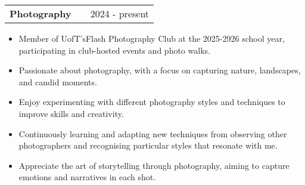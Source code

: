 \documentclass[a4paper,10pt]{article} %
\makeatletter
\newenvironment{joblong}[2]
    {
    \begin{tabularx}{\linewidth}{@{}l X r@{}}
    \textbf{#1} & \hfill &  #2 \\[3.75pt]
    \end{tabularx}
    \begin{minipage}[t]{\linewidth}
    \begin{itemize}[nosep,after=\strut, leftmargin=1em, itemsep=3pt,label=--]
    }
    {
    \end{itemize}
    \end{minipage}    
    }
\makeatother
\begin{document}
\begin{joblong}{Photography}{2024 - present}
\item Member of UofT'sFlash Photography Club at the 2025-2926 school year, participating in club-hosted events and photo walks.
\item Passionate about photography, with a focus on capturing nature, landscapes, and candid moments.
\item Enjoy experimenting with different photography styles and techniques to improve skills and creativity.
\item Continuously learning and adapting new techniques from observing other photographers and recognising particular styles that resonate with me.
\item Appreciate the art of storytelling through photography, aiming to capture emotions and narratives in each shot.
\end{joblong}

\vfill
{}
\end{document}

